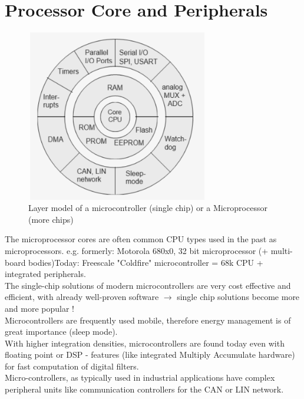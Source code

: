 \section{Processor Core and Peripherals}

    \begin{figure}[h]
    \centering
    \includegraphics[width=8cm, height=7.5cm]{Images/image160.png}
    \caption{Layer model of a microcontroller (single chip) or a Microprocessor (more chips)}
    \label{fig:Fig 112}
    \end{figure}
\os{\newpage}

The microprocessor cores are often common CPU types used in the past as microprocessors. e.g. formerly: Motorola 680x0, 32 bit microprocessor (+ multi-board bodies)Today: Freescale "Coldfire" microcontroller = 68k CPU + integrated peripherals. \\

The single-chip solutions of modern microcontrollers are very cost effective and efficient, with already well-proven software $\rightarrow$ single chip solutions become more and more popular !\\

Microcontrollers are frequently used mobile, therefore energy management is of great importance (sleep mode).\\

With higher integration densities, microcontrollers are found today even with floating point or DSP - features (like integrated Multiply Accumulate hardware) for fast computation of digital filters.\\

Micro-controllers, as typically used in industrial applications have complex peripheral units like communication controllers for the CAN or LIN network.\\

